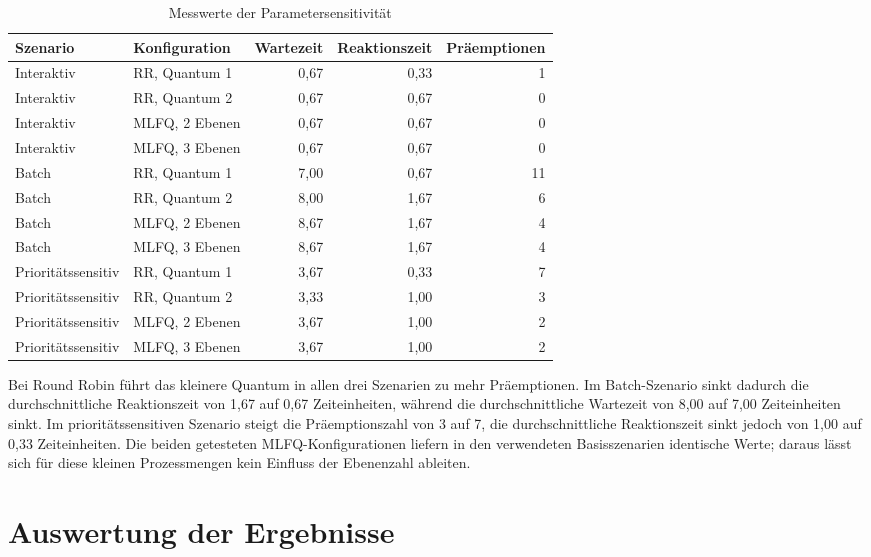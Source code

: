 \begin{table}[htbp]
    \centering
    \scriptsize
    \caption{Messwerte der Parametersensitivität}
    \label{tab:parametermessung}
    \begin{tabular}{llrrr}
        \toprule
        Szenario & Konfiguration & Wartezeit & Reaktionszeit & Präemptionen \\
        \midrule
        Interaktiv & RR, Quantum 1 & 0,67 & 0,33 & 1 \\
        Interaktiv & RR, Quantum 2 & 0,67 & 0,67 & 0 \\
        Interaktiv & MLFQ, 2 Ebenen & 0,67 & 0,67 & 0 \\
        Interaktiv & MLFQ, 3 Ebenen & 0,67 & 0,67 & 0 \\
        Batch & RR, Quantum 1 & 7,00 & 0,67 & 11 \\
        Batch & RR, Quantum 2 & 8,00 & 1,67 & 6 \\
        Batch & MLFQ, 2 Ebenen & 8,67 & 1,67 & 4 \\
        Batch & MLFQ, 3 Ebenen & 8,67 & 1,67 & 4 \\
        Prioritätssensitiv & RR, Quantum 1 & 3,67 & 0,33 & 7 \\
        Prioritätssensitiv & RR, Quantum 2 & 3,33 & 1,00 & 3 \\
        Prioritätssensitiv & MLFQ, 2 Ebenen & 3,67 & 1,00 & 2 \\
        Prioritätssensitiv & MLFQ, 3 Ebenen & 3,67 & 1,00 & 2 \\
        \bottomrule
    \end{tabular}
\end{table}

Bei Round Robin führt das kleinere Quantum in allen drei Szenarien zu mehr Präemptionen. Im Batch-Szenario sinkt dadurch die durchschnittliche Reaktionszeit von 1,67 auf 0,67 Zeiteinheiten, während die durchschnittliche Wartezeit von 8,00 auf 7,00 Zeiteinheiten sinkt. Im prioritätssensitiven Szenario steigt die Präemptionszahl von 3 auf 7, die durchschnittliche Reaktionszeit sinkt jedoch von 1,00 auf 0,33 Zeiteinheiten. Die beiden getesteten MLFQ-Konfigurationen liefern in den verwendeten Basisszenarien identische Werte; daraus lässt sich für diese kleinen Prozessmengen kein Einfluss der Ebenenzahl ableiten.

\section{Auswertung der Ergebnisse}

